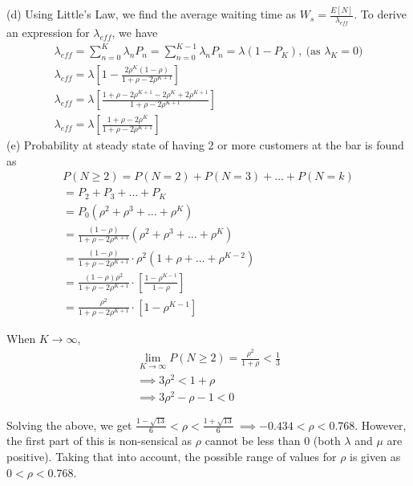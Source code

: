 (d) Using Little's Law, we find the average waiting time as $W_s = \frac{E[N]}{\lambda_{eff}}$. To derive an expression for $\lambda_{eff}$, we have
\begin{gather*}
\lambda_{eff} = \sum_{n=0}^{K}\lambda_n P_n = \sum_{n=0}^{K-1}\lambda_n P_n = \lambda(1-P_K),\ \text{(as $\lambda_K = 0)$}\\
\lambda_{eff} = \lambda \left[1 - \frac{2\rho^K(1-\rho)}{1 + \rho - 2\rho^{K+1}} \right]\\
\lambda_{eff} = \lambda \left[\frac{1 + \rho - 2\rho^{K+1} - 2\rho^K +2\rho^{K+1}}{1 + \rho - 2\rho^{K+1}} \right]\\
\lambda_{eff} = \lambda \left[\frac{1 + \rho - 2\rho^K}{1 + \rho - 2\rho^{K+1}} \right]
\end{gather*}
(e) Probability at steady state of having 2 or more customers at the bar is found as
\begin{gather*}
P(N\ge2) = P(N=2) + P(N=3) + ... + P(N=k)\\
=P_2 + P_3 + ... + P_K\\
=P_0(\rho^2 + \rho^3 + ...+ \rho^K)\\
=\frac{(1-\rho)}{1 + \rho - 2\rho^{K+1}}(\rho^2 + \rho^3 + ...+ \rho^K)\\
=\frac{(1-\rho)}{1 + \rho - 2\rho^{K+1}}\cdot\rho^2(1 + \rho + ...+ \rho^{K-2})\\
=\frac{(1-\rho)\rho^2}{1 + \rho - 2\rho^{K+1}}\cdot\left[\frac{1-\rho^{K-1}}{1-\rho}\right]\\
=\frac{\rho^2}{1 + \rho - 2\rho^{K+1}}\cdot\left[1-\rho^{K-1}\right]
\end{gather*}

When $K\to\infty$,
\begin{gather*}
\lim_{K\to\infty}P(N\ge2) = \frac{\rho^2}{1 + \rho} < \frac{1}{3}\\
\implies 3\rho^2 < 1 + \rho\\
\implies 3\rho^2 - \rho - 1< 0
\end{gather*}

Solving the above, we get $\frac{1 - \sqrt{13}}{6}<\rho<\frac{1+\sqrt{13}}{6} \ \implies -0.434 < \rho < 0.768$. However, the first part of this is non-sensical as $\rho$ cannot be less than 0 (both $\lambda$ and $\mu$ are positive). Taking that into account, the possible range of values for $\rho$ is given as $0 < \rho < 0.768$.